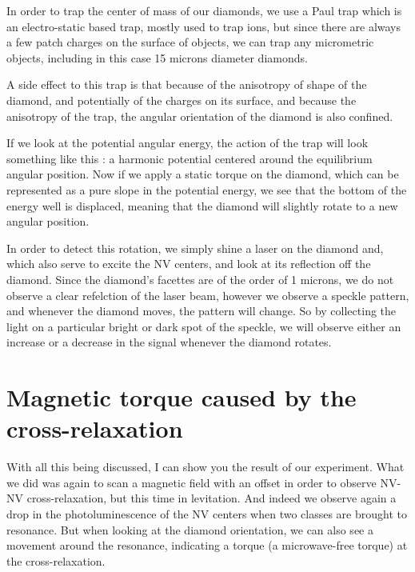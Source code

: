 \documentclass[a4paper]{article}
\begin{document}
In order to trap the center of mass of our diamonds, we use a Paul trap which is an electro-static based trap, mostly used to trap ions, but since there are always a few patch charges on the surface of objects, we can trap any micrometric objects, including in this case 15 microns diameter diamonds. 

A side effect to this trap is that because of the anisotropy of shape of the diamond, and potentially of the charges on its surface, and because the anisotropy of the trap, the angular orientation of the diamond is also confined.

If we look at the potential angular energy, the action of the trap will look something like this : a harmonic potential centered around the equilibrium angular position. Now if we apply a static torque on the diamond, which can be represented as a pure slope in the potential energy, we see that the bottom of the energy well is displaced, meaning that the diamond will slightly rotate to a new angular position.

In order to detect this rotation, we simply shine a laser on the diamond and, which also serve to excite the NV centers, and look at its reflection off the diamond. Since the diamond's facettes are of the order of 1 microns, we do not observe a clear refelction of the laser beam, however we observe a speckle pattern, and whenever the diamond moves, the pattern will change. So by collecting the light on a particular bright or dark spot of the speckle, we will observe either an increase or a decrease in the signal whenever the diamond rotates.


\section{Magnetic torque caused by the cross-relaxation}
With all this being discussed, I can show you the result of our experiment. What we did was again to scan a magnetic field with an offset in order to observe NV-NV cross-relaxation, but this time in levitation. And indeed we observe again a drop in the photoluminescence of the NV centers when two classes are brought to resonance. But when looking at the diamond orientation, we can also see a movement around the resonance, indicating a torque (a microwave-free torque) at the cross-relaxation.
\end{document}
